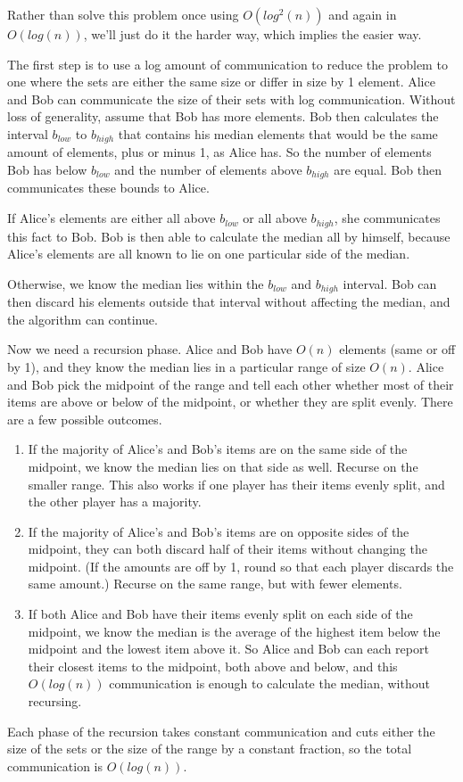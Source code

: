 \documentclass{article}
\newenvironment{problem}[2][Problem]{\begin{trivlist}
\item[\hskip \labelsep {\bfseries #1}\hskip \labelsep {\bfseries #2.}]}{\end{trivlist}}
\begin{document}
\begin{problem}{4}
  Rather than solve this problem once using $O(log^2(n))$ and again in
  $O(log(n))$, we'll just do it the harder way, which implies the
  easier way.
  
  The first step is to use a log amount of communication to reduce the
  problem to one where the sets are either the same size or differ in
  size by 1 element. Alice and Bob can
  communicate the size of their sets with log communication. Without
  loss of generality, assume that Bob has more elements. Bob then
  calculates the interval $b_{low}$ to $b_{high}$ that contains his
  median elements that would be the same amount of elements, plus or
  minus 1, as Alice has. So the number of elements Bob has below
  $b_{low}$ and the number of elements above $b_{high}$ are equal. Bob
  then communicates these bounds to Alice.

  If Alice's elements are either all above $b_{low}$ or all above
  $b_{high}$, she communicates this fact to Bob. Bob is then able to
  calculate the median all by himself, because Alice's elements are
  all known to lie on one particular side of the median.

  Otherwise, we know the median lies within the $b_{low}$ and
  $b_{high}$ interval. Bob can then discard his elements outside that
  interval without affecting the median, and the algorithm can
  continue.

  Now we need a recursion phase. Alice and Bob have $O(n)$
  elements (same or off by 1), and they know the median lies in a
  particular range of size $O(n)$. Alice and Bob pick the midpoint of
  the range and tell each other whether most of their items are above
  or below of the midpoint, or whether they are split evenly. There
  are a few possible outcomes.

  \begin{enumerate}
  \item If the majority of Alice's and Bob's items are on the same
    side of the midpoint, we know the median lies on that side as
    well. Recurse on the smaller range. This also works if one player
    has their items evenly split, and the other player has a majority.
  \item If the majority of Alice's and Bob's items are on opposite
    sides of the midpoint, they can both discard half of their items
    without changing the midpoint. (If the amounts are off by 1,
    round so that each player discards the same amount.) Recurse on
    the same range, but with fewer elements.
    \item If both Alice and Bob have their items evenly split on each
      side of the midpoint, we know the median is the average of the
      highest item below the midpoint and the lowest item above it. So
      Alice and Bob can each report their closest items to the
      midpoint, both above and below, and this $O(log(n))$ communication is enough
      to calculate the median, without recursing.
  \end{enumerate}

  Each phase of the recursion takes constant communication and cuts
  either the size of the sets or the size of the range by a constant
  fraction, so the total communication is $O(log(n))$.
\end{problem}
\end{document}
